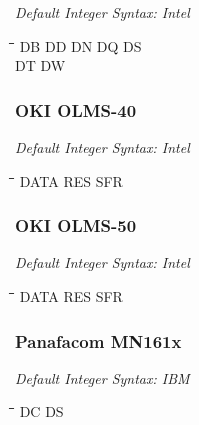 {\em Default Integer Syntax: Intel}

{\tt\begin{tabbing} 
\hspace{3cm}\=\hspace{3cm}\=\hspace{3cm}\=\hspace{3cm}\=\kill
DB         \> DD          \> DN          \> DQ          \> DS \\
DT         \> DW \\
\end{tabbing}}

\subsubsection{OKI OLMS-40}

{\em Default Integer Syntax: Intel}

{\tt\begin{tabbing} 
\hspace{3cm}\=\hspace{3cm}\=\hspace{3cm}\=\hspace{3cm}\=\kill
DATA       \> RES         \> SFR \\
\end{tabbing}}

\subsubsection{OKI OLMS-50}

{\em Default Integer Syntax: Intel}

{\tt\begin{tabbing} 
\hspace{3cm}\=\hspace{3cm}\=\hspace{3cm}\=\hspace{3cm}\=\kill
DATA       \> RES         \> SFR \\
\end{tabbing}}

\subsubsection{Panafacom MN161x}

{\em Default Integer Syntax: IBM}

{\tt\begin{tabbing}
\hspace{3cm}\=\hspace{3cm}\=\hspace{3cm}\=\hspace{3cm}\=\kill
DC         \> DS \\
\end{tabbing}}

